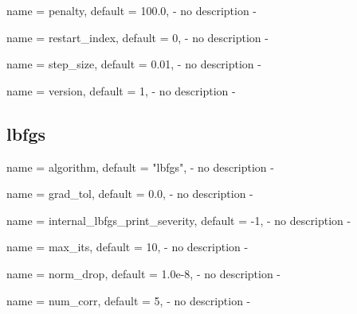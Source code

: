 \begin{parameter}{
    name    = {penalty},
    default = {100.0},
}
- no description -
\end{parameter}

\begin{parameter}{
    name    = {restart_index},
    default = {0},
}
- no description -
\end{parameter}

\begin{parameter}{
    name    = {step_size},
    default = {0.01},
}
- no description -
\end{parameter}

\begin{parameter}{
    name    = {version},
    default = {1},
}
- no description -
\end{parameter}

\subsection{lbfgs}

\begin{parameter}{
    name    = {algorithm},
    default = {"lbfgs"},
}
- no description -
\end{parameter}

\begin{parameter}{
    name    = {grad_tol},
    default = {0.0},
}
- no description -
\end{parameter}

\begin{parameter}{
    name    = {internal_lbfgs_print_severity},
    default = {-1},
}
- no description -
\end{parameter}

\begin{parameter}{
    name    = {max_its},
    default = {10},
}
- no description -
\end{parameter}

\begin{parameter}{
    name    = {norm_drop},
    default = {1.0e-8},
}
- no description -
\end{parameter}

\begin{parameter}{
    name    = {num_corr},
    default = {5},
}
- no description -
\end{parameter}

